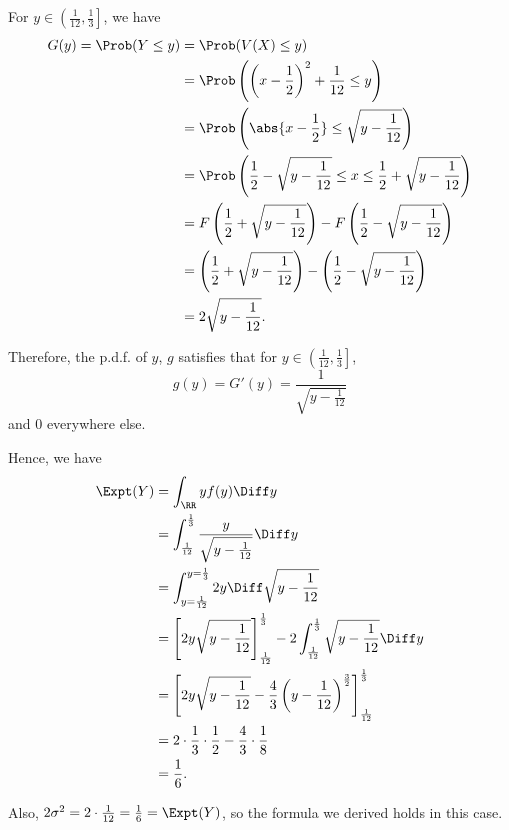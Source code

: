 For \(y \in \left(\frac{1}{12}, \frac{1}{3}\right]\), we have
\begin{align*}
    G(y) = \Prob(Y \leq y) & = \Prob(V(X) \leq y)                                                                                        \\
                           & = \Prob\left(\left(x - \frac{1}{2}\right)^2 + \frac{1}{12} \leq y\right)                                    \\
                           & = \Prob\left(\abs{x - \frac{1}{2}} \leq \sqrt{y - \frac{1}{12}}\right)                                      \\
                           & = \Prob\left(\frac{1}{2} - \sqrt{y - \frac{1}{12}} \leq x \leq \frac{1}{2} + \sqrt{y - \frac{1}{12}}\right) \\
                           & = F\left(\frac{1}{2} + \sqrt{y - \frac{1}{12}}\right) - F\left(\frac{1}{2} - \sqrt{y - \frac{1}{12}}\right) \\
                           & = \left(\frac{1}{2} + \sqrt{y - \frac{1}{12}}\right) - \left(\frac{1}{2} - \sqrt{y - \frac{1}{12}}\right)   \\
                           & = 2 \sqrt{y - \frac{1}{12}}.
\end{align*}

Therefore, the p.d.f. of \(y\), \(g\) satisfies that for \(y \in \left(\frac{1}{12}, \frac{1}{3}\right]\),
\[
    g(y) = G'(y) = \frac{1}{\sqrt{y - \frac{1}{12}}}
\]
and \(0\) everywhere else.

Hence, we have
\begin{align*}
    \Expt(Y) & = \int_{\RR} y f(y) \Diff y                                                                                                                \\
             & = \int_{\frac{1}{12}}^{\frac{1}{3}} \frac{y}{\sqrt{y - \frac{1}{12}}} \Diff y                                                              \\
             & = \int_{y = \frac{1}{12}}^{y = \frac{1}{3}} 2y \Diff \sqrt{y - \frac{1}{12}}                                                               \\
             & = \left[2y\sqrt{y - \frac{1}{12}}\right]_{\frac{1}{12}}^{\frac{1}{3}} - 2\int_{\frac{1}{12}}^{\frac{1}{3}} \sqrt{y - \frac{1}{12}} \Diff y \\
             & = \left[2y\sqrt{y - \frac{1}{12}} - \frac{4}{3} \left(y - \frac{1}{12}\right)^{\frac{3}{2}}\right]_{\frac{1}{12}}^{\frac{1}{3}}            \\
             & = 2 \cdot \frac{1}{3} \cdot \frac{1}{2} - \frac{4}{3} \cdot \frac{1}{8}                                                                    \\
             & = \frac{1}{6}.
\end{align*}

Also, \(2 \sigma^2 = 2 \cdot \frac{1}{12} = \frac{1}{6} = \Expt(Y)\), so the formula we derived holds in this case.